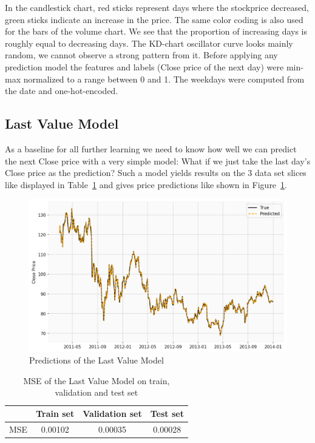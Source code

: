 \documentclass[utf8x]{ctexart}
\begin{document}
In the candlestick chart, red sticks represent days where the stockprice decreased, green sticks indicate an increase in the price. The same color coding is also used for the bars of the volume chart. We see that the proportion of increasing days is roughly equal to decreasing days. The KD-chart oscillator curve looks mainly random, we cannot observe a strong pattern from it.
Before applying any prediction model the features and labels (Close price of the next day) were min-max normalized to a range between 0 and 1. The weekdays were computed from the date and one-hot-encoded.

\subsection{Last Value Model}

As a  baseline for all further learning we need to know how well we can predict the next Close price with a very simple model: What if we just take the last day's Close price as the prediction?
Such a model yields results on the 3 data set slices like displayed in Table~\ref{tab:last_value_model} and gives price predictions like shown in Figure~\ref{fig:last_value_model}.

\begin{figure}[htb]
  \centering
  \includegraphics[width=\textwidth]{../images/last_value_model.png}
  \caption{Predictions of the Last Value Model}
  \label{fig:last_value_model}
\end{figure}

\begin{table}[ht]
  \centering
  \caption{MSE of the Last Value Model on train, validation and test set}
  \label{tab:last_value_model}
  \begin{tabular}{c|ccc}
        & Train set & Validation set & Test set \\
    \hline
    MSE & 0.00102   & 0.00035        & 0.00028  \\
  \end{tabular}
\end{table}
\end{document}
